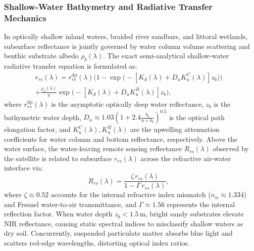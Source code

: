 \subsubsection{Shallow-Water Bathymetry and Radiative Transfer Mechanics}
In optically shallow inland waters, braided river sandbars, and littoral wetlands, subsurface reflectance is jointly governed by water column volume scattering and benthic substrate albedo $\rho_b(\lambda)$. The exact semi-analytical shallow-water radiative transfer equation is formulated as:
\begin{equation}
\begin{split}
    r_{rs}(\lambda) = r_{rs}^{\text{dp}}(\lambda) \Big(1 - \exp\big(-[K_d(\lambda) + D_u K_u^C(\lambda)] z_b\big)\Big) \\
    + \frac{\rho_b(\lambda)}{\pi} \exp\big(-[K_d(\lambda) + D_u K_u^B(\lambda)] z_b\big),
\end{split}
    \label{eq:shallow_water}
\end{equation}
where $r_{rs}^{\text{dp}}(\lambda)$ is the asymptotic optically deep water reflectance, $z_b$ is the bathymetric water depth, $D_u \approx 1.03(1 + 2.4\frac{b_b}{a+b_b})^{0.5}$ is the optical path elongation factor, and $K_u^C(\lambda), K_u^B(\lambda)$ are the upwelling attenuation coefficients for water column and bottom reflectance, respectively. Above the water surface, the water-leaving remote sensing reflectance $R_{rs}(\lambda)$ observed by the satellite is related to subsurface $r_{rs}(\lambda)$ across the refractive air-water interface via:
\begin{equation}
    R_{rs}(\lambda) = \frac{\zeta \, r_{rs}(\lambda)}{1 - \Gamma \, r_{rs}(\lambda)},
    \label{eq:air_water_interface}
\end{equation}
where $\zeta \approx 0.52$ accounts for the internal refractive index mismatch ($n_w \approx 1.334$) and Fresnel water-to-air transmittance, and $\Gamma \approx 1.56$ represents the internal reflection factor. When water depth $z_b < 1.5$\,m, bright sandy substrates elevate NIR reflectance, causing static spectral indices to misclassify shallow waters as dry soil. Concurrently, suspended particulate matter absorbs blue light and scatters red-edge wavelengths, distorting optical index ratios.

